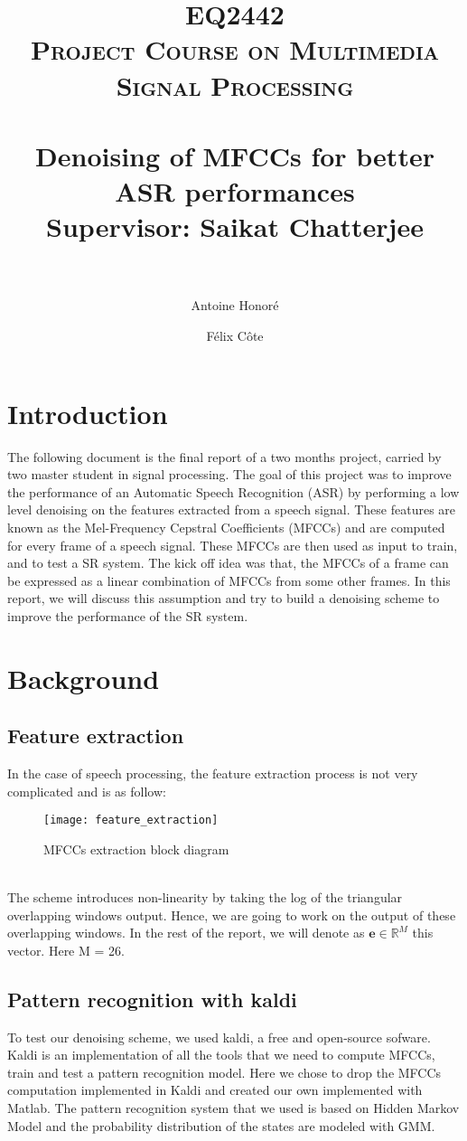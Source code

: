 \documentclass[a4paper]{report}
\title{	 
\textsc{EQ2442\\Project Course on Multimedia Signal Processing}\\[25pt] 
\horrule{1pt} \\[0.4cm] %
\huge {Denoising of MFCCs for better ASR performances} \\[0.4 cm] %
\Large{Supervisor: Saikat Chatterjee}\\[0.4 cm]
\horrule{2pt} \\[0.2cm] %
}
\author{ Antoine Honoré\\ \email{honore@kth.se} \and Félix Côte\\\email{fcote@kth.se} }
\begin{document}
\maketitle
\tableofcontents
\section*{Introduction}
The following document is the final report of a two months project, carried by two master student in signal processing. The goal of this project was to improve the performance of an Automatic Speech Recognition (ASR) by performing a low level denoising on the features extracted from  a speech signal. These features are known as the Mel-Frequency Cepstral Coefficients (MFCCs) and are computed for every frame of a speech signal. These MFCCs are then used as input to train, and to test a SR system. The kick off idea was that, the MFCCs of a frame can be expressed as a linear combination of MFCCs from some other frames. In this report, we will discuss this assumption and try to build a denoising scheme to improve the performance of the SR system.
\section{Background}
\subsection{Feature extraction}
In the case of speech processing, the feature extraction process is not very complicated and is as follow:
\begin{figure}[!ht]
\centering
\texttt{[image: feature\_extraction]}
\caption{MFCCs extraction block diagram}
\label{feature_extraction}
\end{figure}\\
The scheme introduces non-linearity by taking the log of the triangular overlapping windows output. Hence, we are going to work on the output of these overlapping windows. In the rest of the report, we will denote as $\textbf{e} \in \mathbb{R}^M$ this vector. Here M = 26.

\subsection{Pattern recognition with kaldi}
To test our denoising scheme, we used kaldi, a free and open-source sofware. Kaldi is an implementation of all the tools that we need to compute MFCCs, train and test a pattern recognition model. Here we chose to drop the MFCCs computation implemented in Kaldi and created our own implemented with Matlab. The pattern recognition system that we used is based on Hidden Markov Model and the probability distribution of the states are modeled with GMM.
\end{document}

